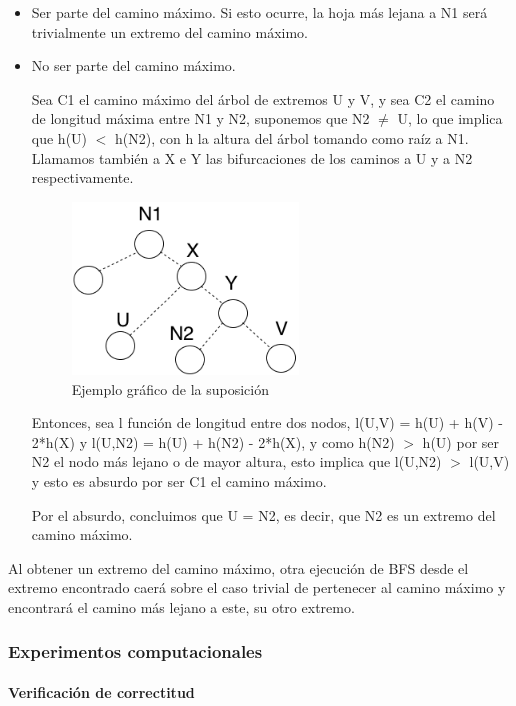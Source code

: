 \documentclass[a4paper, 10pt, twoside]{article}
\begin{document}
\begin{itemize}
  \item Ser parte del camino máximo. Si esto ocurre, la hoja más lejana a N1 será trivialmente un extremo del camino máximo.
  \item No ser parte del camino máximo.
  
  Sea C1 el camino máximo del árbol de extremos U y V, y sea C2 el camino de longitud máxima entre N1 y N2, suponemos que N2 $\neq$ U, lo que implica que h(U) $<$ h(N2), con h la altura del árbol tomando como raíz a N1. Llamamos también a X e Y las bifurcaciones de los caminos a U y a N2 respectivamente.

\begin{figure}[ht!]
\centering
\includegraphics[width=60mm]{2b.png}
\caption{Ejemplo gráfico de la suposición}
\label{overflow}
\end{figure}  
  
  Entonces, sea l función de longitud entre dos nodos, l(U,V) = h(U) + h(V) - 2*h(X) y l(U,N2) = h(U) + h(N2) - 2*h(X), y como h(N2) $>$ h(U) por ser N2 el nodo más lejano o de mayor altura, esto implica que l(U,N2) $>$ l(U,V) y esto es absurdo por ser C1 el camino máximo.
  
  Por el absurdo, concluimos que U = N2, es decir, que N2 es un extremo del camino máximo.
\end{itemize}

Al obtener un extremo del camino máximo, otra ejecución de BFS desde el extremo encontrado caerá sobre el caso trivial de pertenecer al camino máximo y encontrará el camino más lejano a este, su otro extremo.

\subsubsection{Experimentos computacionales}

\paragraph{Verificación de correctitud}
\end{document}
